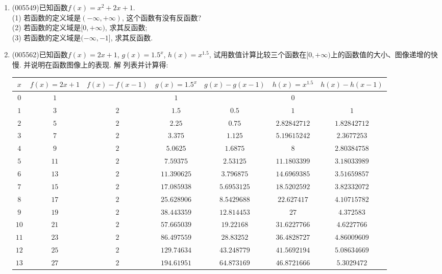 \documentclass[10pt,a4paper]{article}
\begin{document}
\begin{enumerate}[1.]
\item {\tiny (005549)}已知函数$f(x)=x^2+2x+1$.\\
(1) 若函数的定义域是$(-\infty ,+\infty)$, 这个函数有没有反函数?\\
(2) 若函数的定义域是$[0,+\infty)$, 求其反函数;\\
(3) 若函数的定义域是$(-\infty ,-1]$, 求其反函数.
\item {\tiny (005562)}已知函数$f(x)=2x+1$, $g(x)=1.5^x$, $h(x)=x^{1.5}$, 试用数值计算比较三个函数在$[0,+\infty)$上的函数值的大小、图像递增的快慢. 并说明在函数图像上的表现.
解  列表并计算得:
\begin{center}
    \begin{longtable}{|c|c|c|c|c|c|c|}
        \hline
        $x$	 & $f(x)=2x+1$ & $f(x)-f(x-1)$ & $g(x)=1.5^x$ & $g(x)-g(x-1)$ & $h(x)=x^{1.5}$ & $h(x)-h(x-1)$ \\ \hline
        \endhead
        $0$ & $1$ & & $1$ & & $0$ &  \\ \hline
        $1$ & $3$ & $2$ & $1.5$ & $0.5$ & $1$ & $1$\\ \hline
        $2$ & $5$ & $2$ & $2.25$ & $0.75$ & $2.82842712$ & $1.82842712$\\ \hline
        $3$ & $7$ & $2$ & $3.375$ & $1.125$ & $5.19615242$ & $2.3677253$\\ \hline
        $4$ & $9$ & $2$ & $5.0625$ & $1.6875$ & $8$ & $2.80384758$\\ \hline
        $5$ & $11$ & $2$ & $7.59375$ & $2.53125$ & $11.1803399$ & $3.18033989$\\ \hline
        $6$ & $13$ & $2$ & $11.390625$ & $3.796875$ & $14.6969385$ & $3.51659857$\\ \hline
        $7$ & $15$ & $2$ & $17.085938$ & $5.6953125$ & $18.5202592$ & $3.82332072$\\ \hline
        $8$ & $17$ & $2$ & $25.628906$ & $8.5429688$ & $22.627417$ & $4.10715782$\\ \hline
        $9$ & $19$ & $2$ & $38.443359$ & $12.814453$ & $27$ & $4.372583$\\ \hline
        $10$ & $21$ & $2$ & $57.665039$ & $19.22168$ & $31.6227766$ & $4.6227766$\\ \hline
        $11$ & $23$ & $2$ & $86.497559$ & $28.83252$ & $36.4828727$ & $4.86009609$\\ \hline
        $12$ & $25$ & $2$ & $129.74634$ & $43.248779$ & $41.5692194$ & $5.08634669$\\ \hline
        $13$ & $27$ & $2$ & $194.61951$ & $64.873169$ & $46.8721666$ & $5.3029472$\\ \hline

\end{longtable}
\end{center}
\end{enumerate}
\end{document}
